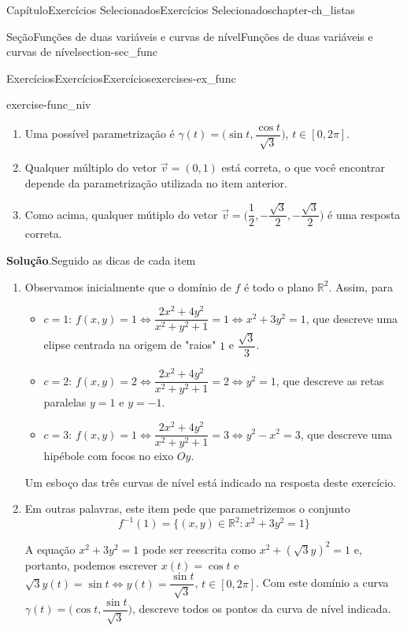 \documentclass[oneside,10pt,]{book}
\newcommand{\blocktitlefont}{\relax}
\numberwithin{equation}{section}
\newcommand{\R}{\mathbb R}
\begin{document}
\begin{chapterptx}{Capítulo}{Exercícios Selecionados}{}{Exercícios Selecionados}{}{}{chapter-ch_listas}
\begin{sectionptx}{Seção}{Funções de duas variáveis e curvas de nível}{}{Funções de duas variáveis e curvas de nível}{}{}{section-sec_func}
\begin{exercises-subsection-numberless}{Exercícios}{Exercícios}{}{Exercícios}{}{}{exercises-ex_func}
\begin{divisionexercise}{7}{}{}{exercise-func_niv}
\begin{enumerate}[label=\alph*.]
\begin{sidebyside}{2}{0.05}{0.05}{0.1}
\begin{sbspanel}{0.5}[center]
\begin{panelfigureptx}{Figura}{Curvas de nível.}{figure-fig_niveis}{}
{
}%
\tcblower
\end{panelfigureptx}%
\end{sbspanel}%
\end{sidebyside}%
%
\item{}Uma possível parametrização é \(\gamma(t)=\big(\sin t,
\dfrac{\cos t}{\sqrt{3}}\big)\), \(t\in [0,2\pi]\).%
\item{}Qualquer múltiplo do vetor \(\vec{v}=(0,1)\) está correta, o que você encontrar depende da parametrização utilizada no item anterior.%
\item{}Como acima, qualquer mútiplo do vetor \(\vec{v}=\big(\dfrac{1}{2},-\dfrac{\sqrt{3}}{2},-\dfrac{\sqrt{3}}{2}\big)\) é uma resposta correta.%
\end{enumerate}
%
\par\smallskip%
\noindent\textbf{\blocktitlefont Solução}.\hypertarget{solution-func_niv-d}{}\quad{}Seguido as dicas de cada item%
\begin{enumerate}[label=\alph*.]
\item{}Observamos inicialmente que o domínio de \(f\) é todo o plano \(\R^2\). Assim, para%
\begin{itemize}[label=\textbullet]
\item{}\(c=1\): \(f(x,y)=1\iff
\dfrac{2x^2+4y^2}{x^2+y^2+1}=1\iff x^2+3y^2=1\), que descreve uma elipse centrada na origem de "raios" \(1\) e \(\dfrac{\sqrt{3}}{3}\).%
\item{}\(c=2\): \(f(x,y)=2\iff
\dfrac{2x^2+4y^2}{x^2+y^2+1}=2\iff y^2=1\), que descreve as retas paralelas \(y=1\) e \(y=-1\).%
\item{}\(c=3\): \(f(x,y)=1\iff
\dfrac{2x^2+4y^2}{x^2+y^2+1}=3\iff y^2-x^2=3\), que descreve uma hipébole com focos no eixo \(Oy\).%
\end{itemize}
Um esboço das três curvas de nível está indicado na resposta deste exercício.%
\item{}Em outras palavras, este item pede que parametrizemos o conjunto%
\begin{equation*}
f^{-1}(1)=\big\{(x,y)\in\R^2\colon
x^2+3y^2=1\big\}
\end{equation*}
%
\par
A equação \(x^2+3y^2=1\) pode ser reescrita como \(x^2+(\sqrt{3}y)^2=1\) e, portanto, podemos escrever \(x(t)=\cos t\) e \(\sqrt{3}y(t)=\sin t\iff
y(t)=\dfrac{\sin t}{\sqrt{3}}\), \(t\in[0,2\pi]\). Com este domínio a curva \(\gamma(t)=\big(\cos t,\dfrac{\sin
t}{\sqrt{3}}\big)\), descreve todos os pontos da curva de nível indicada.%

\end{enumerate}
\end{divisionexercise}
\end{exercises-subsection-numberless}
\end{sectionptx}
\end{chapterptx}
\end{document}
